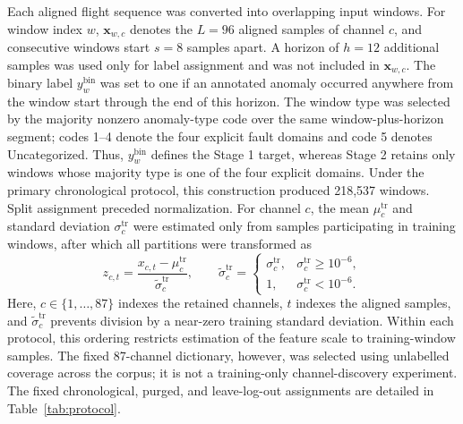 Each aligned flight sequence was converted into overlapping input windows. For window index $w$, $\mathbf{x}_{w,c}$ denotes the $L=96$ aligned samples of channel $c$, and consecutive windows start $s=8$ samples apart. A horizon of $h=12$ additional samples was used only for label assignment and was not included in $\mathbf{x}_{w,c}$. The binary label $y_w^{\mathrm{bin}}$ was set to one if an annotated anomaly occurred anywhere from the window start through the end of this horizon. The window type was selected by the majority nonzero anomaly-type code over the same window-plus-horizon segment; codes 1--4 denote the four explicit fault domains and code 5 denotes Uncategorized. Thus, $y_w^{\mathrm{bin}}$ defines the Stage 1 target, whereas Stage 2 retains only windows whose majority type is one of the four explicit domains. Under the primary chronological protocol, this construction produced 218,537 windows. Split assignment preceded normalization. For channel $c$, the mean $\mu_c^{\mathrm{tr}}$ and standard deviation $\sigma_c^{\mathrm{tr}}$ were estimated only from samples participating in training windows, after which all partitions were transformed as
\begin{equation}
z_{c,t}=\frac{x_{c,t}-\mu_c^{\mathrm{tr}}}{\widetilde{\sigma}_c^{\mathrm{tr}}},\qquad
\widetilde{\sigma}_c^{\mathrm{tr}}=
\begin{cases}
\sigma_c^{\mathrm{tr}}, & \sigma_c^{\mathrm{tr}}\geq 10^{-6},\\
1, & \sigma_c^{\mathrm{tr}}<10^{-6}.
\end{cases}
\label{eq:channel_standardization}
\end{equation}
Here, $c\in\{1,\ldots,87\}$ indexes the retained channels, $t$ indexes the aligned samples, and $\widetilde{\sigma}_c^{\mathrm{tr}}$ prevents division by a near-zero training standard deviation. Within each protocol, this ordering restricts estimation of the feature scale to training-window samples. The fixed 87-channel dictionary, however, was selected using unlabelled coverage across the corpus; it is not a training-only channel-discovery experiment. The fixed chronological, purged, and leave-log-out assignments are detailed in Table~\ref{tab:protocol}.

